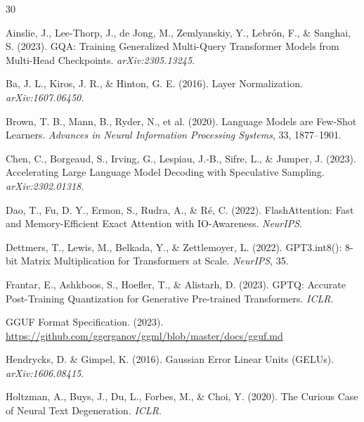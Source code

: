\documentclass[12pt,a4paper]{article}
\begin{document}
\newpage

\begin{thebibliography}{30}

Ainslie, J., Lee-Thorp, J., de Jong, M., Zemlyanskiy, Y., Lebr\'{o}n, F., \& Sanghai, S. (2023). GQA: Training Generalized Multi-Query Transformer Models from Multi-Head Checkpoints. \emph{arXiv:2305.13245}.

Ba, J. L., Kiros, J. R., \& Hinton, G. E. (2016). Layer Normalization. \emph{arXiv:1607.06450}.

Brown, T. B., Mann, B., Ryder, N., et al. (2020). Language Models are Few-Shot Learners. \emph{Advances in Neural Information Processing Systems}, 33, 1877--1901.

Chen, C., Borgeaud, S., Irving, G., Lespiau, J.-B., Sifre, L., \& Jumper, J. (2023). Accelerating Large Language Model Decoding with Speculative Sampling. \emph{arXiv:2302.01318}.

Dao, T., Fu, D. Y., Ermon, S., Rudra, A., \& R\'{e}, C. (2022). FlashAttention: Fast and Memory-Efficient Exact Attention with IO-Awareness. \emph{NeurIPS}.

Dettmers, T., Lewis, M., Belkada, Y., \& Zettlemoyer, L. (2022). GPT3.int8(): 8-bit Matrix Multiplication for Transformers at Scale. \emph{NeurIPS}, 35.

Frantar, E., Ashkboos, S., Hoefler, T., \& Alistarh, D. (2023). GPTQ: Accurate Post-Training Quantization for Generative Pre-trained Transformers. \emph{ICLR}.

GGUF Format Specification. (2023). \url{https://github.com/ggerganov/ggml/blob/master/docs/gguf.md}

Hendrycks, D. \& Gimpel, K. (2016). Gaussian Error Linear Units (GELUs). \emph{arXiv:1606.08415}.

Holtzman, A., Buys, J., Du, L., Forbes, M., \& Choi, Y. (2020). The Curious Case of Neural Text Degeneration. \emph{ICLR}.


\end{thebibliography}
\end{document}
